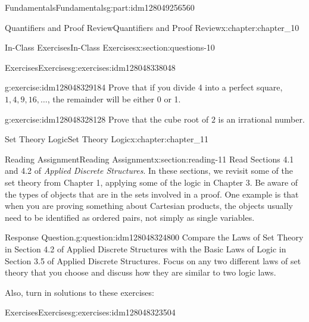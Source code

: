 \documentclass[oneside,10pt,]{book}
\numberwithin{equation}{section}
\begin{document}
\begin{partptx}{Fundamentals}{}{Fundamentals}{}{}{g:part:idm128049256560}
\begin{chapterptx}{Quantifiers and Proof Review}{}{Quantifiers and Proof Review}{}{}{x:chapter:chapter_10}
\begin{sectionptx}{In-Class Exercises}{}{In-Class Exercises}{}{}{x:section:questions-10}
\begin{exercises-subsection}{Exercises}{}{Exercises}{}{}{g:exercises:idm128048338048}
\begin{exercisegroup}
\begin{divisionexerciseeg}{5}{}{}{g:exercise:idm128048329184}%
Prove that if you divide 4 into a perfect square, \(1, 4, 9, 16, \dots\), the remainder will be either 0 or 1.%
\end{divisionexerciseeg}%
\begin{divisionexerciseeg}{6}{}{}{g:exercise:idm128048328128}%
Prove that the cube root of \(2\) is an irrational number.%
\end{divisionexerciseeg}%
\end{exercisegroup}
\par\medskip\noindent
\end{exercises-subsection}
\end{sectionptx}
\end{chapterptx}
%
\typeout{************************************************}
\typeout{************************************************}
%
\begin{chapterptx}{Set Theory Logic}{}{Set Theory Logic}{}{}{x:chapter:chapter_11}
%
%
\typeout{************************************************}
\typeout{************************************************}
%
\begin{sectionptx}{Reading Assignment}{}{Reading Assignment}{}{}{x:section:reading-11}
Read Sections 4.1  and 4.2 of \emph{Applied Discrete Structures}.  In these sections, we revisit some of the set theory from Chapter 1, applying some of the logic in Chapter 3. Be aware of the types of objects that are in the sets involved in a proof.  One example is that when you are proving something about Cartesian products, the objects usually need to be identified as ordered pairs, not simply as single variables.%
\begin{question}{Response Question.}{g:question:idm128048324800}%
Compare the Laws of Set Theory in Section 4.2 of Applied Discrete Structures with the Basic Laws of Logic in Section 3.5 of Applied Discrete Structures.  Focus on any two different laws of set theory that you choose and discuss how they are similar to two logic laws.%
\end{question}
Also, turn in solutions to these exercises:%
%
%
\typeout{************************************************}
\typeout{************************************************}
%
\begin{exercises-subsection}{Exercises}{}{Exercises}{}{}{g:exercises:idm128048323504}
\par\medskip\noindent%

\end{exercises-subsection}
\end{sectionptx}
\end{chapterptx}
\end{partptx}
\end{document}
